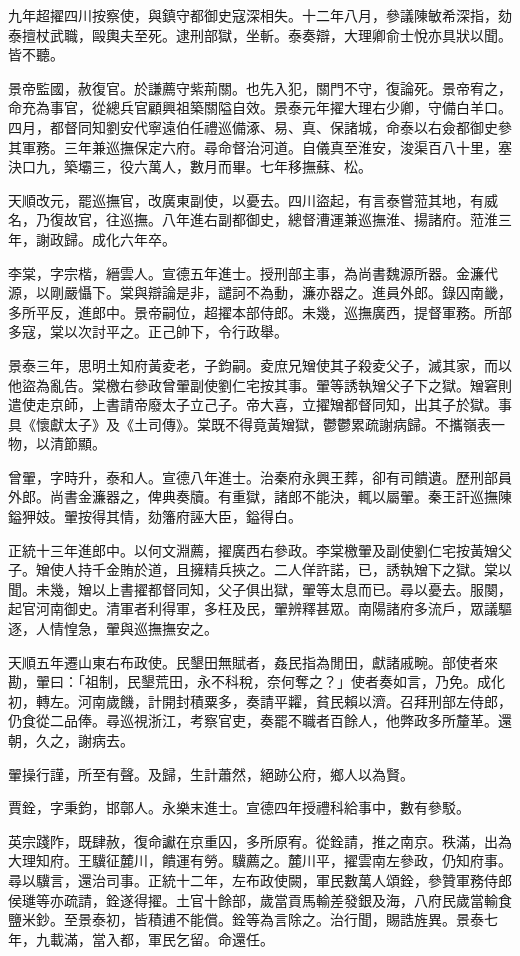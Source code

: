 \begin{pinyinscope}
九年超擢四川按察使，與鎮守都御史寇深相失。十二年八月，參議陳敏希深指，劾泰擅杖武職，毆輿夫至死。逮刑部獄，坐斬。泰奏辯，大理卿俞士悅亦具狀以聞。皆不聽。

景帝監國，赦復官。於謙薦守紫荊關。也先入犯，關門不守，復論死。景帝宥之，命充為事官，從總兵官顧興祖築關隘自效。景泰元年擢大理右少卿，守備白羊口。四月，都督同知劉安代寧遠伯任禮巡備涿、易、真、保諸城，命泰以右僉都御史參其軍務。三年兼巡撫保定六府。尋命督治河道。自儀真至淮安，浚渠百八十里，塞決口九，築壩三，役六萬人，數月而畢。七年移撫蘇、松。

天順改元，罷巡撫官，改廣東副使，以憂去。四川盜起，有言泰嘗蒞其地，有威名，乃復故官，往巡撫。八年進右副都御史，總督漕運兼巡撫淮、揚諸府。蒞淮三年，謝政歸。成化六年卒。

李棠，字宗楷，縉雲人。宣德五年進士。授刑部主事，為尚書魏源所器。金濂代源，以剛嚴懾下。棠與辯論是非，譴訶不為動，濂亦器之。進員外郎。錄囚南畿，多所平反，進郎中。景帝嗣位，超擢本部侍郎。未幾，巡撫廣西，提督軍務。所部多寇，棠以次討平之。正己帥下，令行政舉。

景泰三年，思明土知府黃夌老，子鈞嗣。夌庶兄矰使其子殺夌父子，滅其家，而以他盜為亂告。棠檄右參政曾翬副使劉仁宅按其事。翬等誘執矰父子下之獄。矰窘則遣使走京師，上書請帝廢太子立己子。帝大喜，立擢矰都督同知，出其子於獄。事具《懷獻太子》及《土司傳》。棠既不得竟黃矰獄，鬱鬱累疏謝病歸。不攜嶺表一物，以清節顯。

曾翬，字時升，泰和人。宣德八年進士。治秦府永興王葬，卻有司饋遺。歷刑部員外郎。尚書金濂器之，俾典奏牘。有重獄，諸郎不能決，輒以屬翬。秦王訐巡撫陳鎰狎妓。翬按得其情，劾籓府誣大臣，鎰得白。

正統十三年進郎中。以何文淵薦，擢廣西右參政。李棠檄翬及副使劉仁宅按黃矰父子。矰使人持千金賄於道，且擁精兵挾之。二人佯許諾，已，誘執矰下之獄。棠以聞。未幾，矰以上書擢都督同知，父子俱出獄，翬等太息而已。尋以憂去。服闋，起官河南御史。清軍者利得軍，多枉及民，翬辨釋甚眾。南陽諸府多流戶，眾議驅逐，人情惶急，翬與巡撫撫安之。

天順五年遷山東右布政使。民墾田無賦者，姦民指為閒田，獻諸戚畹。部使者來勘，翬曰：「祖制，民墾荒田，永不科稅，奈何奪之？」使者奏如言，乃免。成化初，轉左。河南歲饑，計開封積粟多，奏請平糶，貧民賴以濟。召拜刑部左侍郎，仍食從二品俸。尋巡視浙江，考察官吏，奏罷不職者百餘人，他弊政多所釐革。還朝，久之，謝病去。

翬操行謹，所至有聲。及歸，生計蕭然，絕跡公府，鄉人以為賢。

賈銓，字秉鈞，邯鄣人。永樂末進士。宣德四年授禮科給事中，數有參駁。

英宗踐阼，既肆赦，復命讞在京重囚，多所原宥。從銓請，推之南京。秩滿，出為大理知府。王驥征麓川，饋運有勞。驥薦之。麓川平，擢雲南左參政，仍知府事。尋以驥言，還治司事。正統十二年，左布政使闕，軍民數萬人頌銓，參贊軍務侍郎侯璡等亦疏請，銓遂得擢。土官十餘部，歲當貢馬輸差發銀及海，八府民歲當輸食鹽米鈔。至景泰初，皆積逋不能償。銓等為言除之。治行聞，賜誥旌異。景泰七年，九載滿，當入都，軍民乞留。命還任。


\end{pinyinscope}
